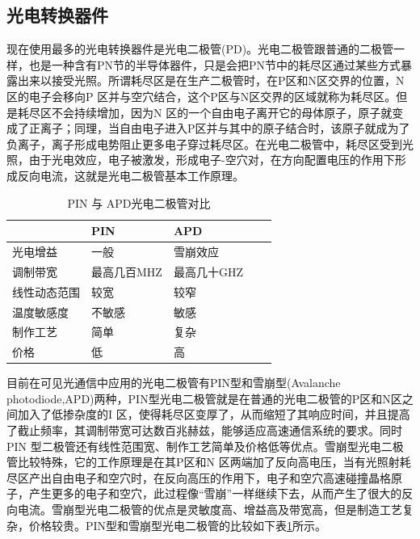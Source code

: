 \subsection{光电转换器件}
现在使用最多的光电转换器件是光电二极管(PD)。光电二极管跟普通的二极管一样，也是一种含有PN节的半导体器件，只是会把PN节中的耗尽区通过某些方式暴露出来以接受光照。所谓耗尽区是在生产二极管时，在P区和N区交界的位置，N 区的电子会移向P 区并与空穴结合，这个P区与N区交界的区域就称为耗尽区。但是耗尽区不会持续增加，因为N 区的一个自由电子离开它的母体原子，原子就变成了正离子；同理，当自由电子进入P区并与其中的原子结合时，该原子就成为了负离子，离子形成电势阻止更多电子穿过耗尽区。在光电二极管中，耗尽区受到光照，由于光电效应，电子被激发，形成电子-空穴对，在方向配置电压的作用下形成反向电流，这就是光电二极管基本工作原理。
\begin{table}[htbp]
    \caption{PIN 与 APD光电二极管对比}
    \label{tab:PIN_APD_Comparsion}
    \centering
    \begin{tabular}{lllll}
        \toprule
         & PIN & APD \\
        \midrule
        光电增益       & 一般   &雪崩效应    \\
        调制带宽       & 最高几百MHZ  &最高几十GHZ    \\
        线性动态范围   & 较宽  &较窄    \\
        温度敏感度    & 不敏感  &敏感    \\
        制作工艺    &简单 &复杂    \\
        价格    & 低  &高    \\
        \bottomrule
    \end{tabular}
\end{table}

目前在可见光通信中应用的光电二极管有PIN型和雪崩型(Avalanche photodiode,APD)两种，PIN型光电二极管就是在普通的光电二极管的P区和N区之间加入了低掺杂度的I 区，使得耗尽区变厚了，从而缩短了其响应时间，并且提高了截止频率，其调制带宽可达数百兆赫兹，能够适应高速通信系统的要求。同时PIN 型二极管还有线性范围宽、制作工艺简单及价格低等优点。雪崩型光电二极管比较特殊，它的工作原理是在其P区和N 区两端加了反向高电压，当有光照射耗尽区产出自由电子和空穴时，在反向高压的作用下，电子和空穴高速碰撞晶格原子，产生更多的电子和空穴，此过程像“雪崩”一样继续下去，从而产生了很大的反向电流。雪崩型光电二极管的优点是灵敏度高、增益高及带宽高，但是制造工艺复杂，价格较贵。PIN型和雪崩型光电二极管的比较如下表\ref{tab:PIN_APD_Comparsion}所示。


